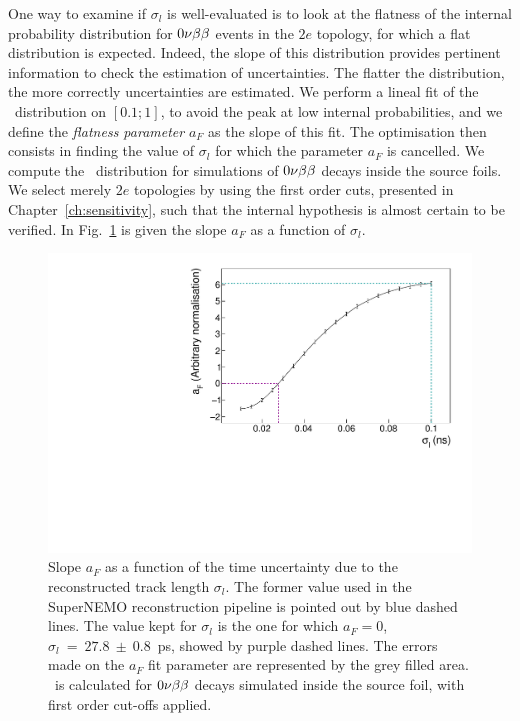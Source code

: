 One way to examine if $\sigma_{l}$ is well-evaluated is to look at the flatness of the internal probability distribution for $0\nu\beta\beta$ events in the $2e$ topology, for which a flat distribution is expected.
Indeed, the slope of this distribution provides pertinent information to check the estimation of uncertainties.
The flatter the distribution, the more correctly uncertainties are estimated.
We perform a lineal fit of the \Pint\ distribution on $[0.1;1]$, to avoid the peak at low internal probabilities, and we define the \emph{flatness parameter} $a_{F}$ as the slope of this fit.
The optimisation then consists in finding the value of $\sigma_{l}$ for which the parameter $a_{F}$ is cancelled.
We compute the \Pint\ distribution for simulations of $0\nu\beta\beta$ decays inside the source foils.
We select merely $2e$ topologies by using the first order cuts, presented in Chapter~\ref{ch:sensitivity}, such that the internal hypothesis is almost certain to be verified.
In Fig.~\ref{fig:flatness} is given the slope $a_{F}$ as a function of $\sigma_{l}$.
\begin{figure}[!h]
  \centering
  \includegraphics[width=13cm]{timedifference/fig_timediff/flatness.pdf}
  \caption{Slope $a_{F}$ as a function of the time uncertainty due to the reconstructed track length $\sigma_{l}$.
    The former value used in the SuperNEMO reconstruction pipeline is pointed out by blue dashed lines.
    The value kept for $\sigma_{l}$ is the one for which $a_{F}=0$, $\sigma_{l}~=~27.8~\pm~0.8$~ps, showed by purple dashed lines.
    The errors made on the $a_{F}$ fit parameter are represented by the grey filled area.
    \Pint\ is calculated for $0\nu\beta\beta$ decays simulated inside the source foil, with first order cut-offs applied.
    \label{fig:flatness}}
\end{figure}

